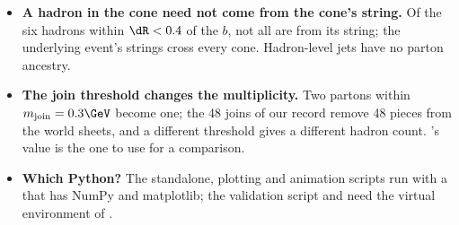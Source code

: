 \begin{pitfalls}
\begin{itemize}[nosep]
    Doing otherwise changes the kaon and baryon rates.
  \item \textbf{A hadron in the cone need not come from the cone's string.}
    Of the six hadrons within $\dR<0.4$ of the $b$, not all are from its
    string; the underlying event's strings cross every cone. Hadron-level
    jets have no parton ancestry.
  \item \textbf{The join threshold changes the multiplicity.} Two partons
    within $m_{\mathrm{join}}=0.3\GeV$ become one; the 48 joins of our
    record remove 48 pieces from the world sheets, and a different
    threshold gives a different hadron count. \PYTHIA's value is the one
    to use for a comparison.
  \item \textbf{Which Python?} The standalone, plotting and animation
    scripts run with a  that has NumPy and matplotlib; the
    validation script and  need the virtual
    environment of .
\end{itemize}
\end{pitfalls}

